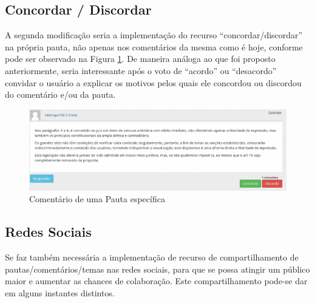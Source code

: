 \subsection{Concordar / Discordar}
A segunda modificação seria a implementação do recurso ``concordar/discordar'' na própria pauta, não apenas nos comentários da mesma como é hoje, conforme pode ser observado na Figura \ref{fig:pauta-espec-mcivil}. De maneira análoga ao que foi proposto anteriormente, seria interessante após o voto de ``acordo'' ou ``desacordo'' convidar o usuário a explicar os motivos pelos quais ele concordou ou discordou do comentário e/ou da pauta.
    \begin{figure}[htb]%
        \begin{center}
            \includegraphics[scale=0.7]{./imagens/mcivil-comentario-pauta.png}%
        \end{center}%
        \caption{Comentário de uma Pauta específica \label{fig:pauta-espec-mcivil}}%
    \end{figure}%

\subsection{Redes Sociais}
	Se faz também necessária a implementação de recurso de compartilhamento de pautas/comentários/temas nas redes sociais, para que se possa atingir um público maior e aumentar as chances de colaboração. Este compartilhamento pode-se dar em alguns instantes distintos.
	
